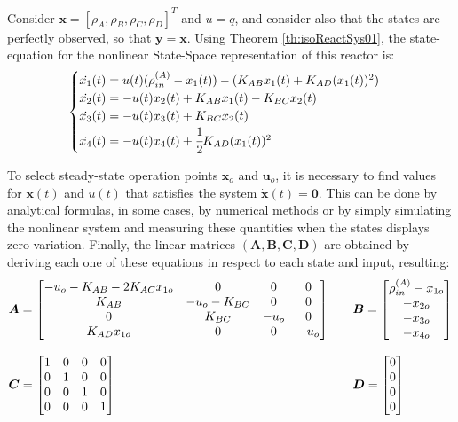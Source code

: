 \documentclass[a4paper,11pt]{book}
\numberwithin{figure}{chapter}
\numberwithin{equation}{chapter}
\numberwithin{table}{chapter}
\theoremstyle{definition}
\begin{document}
Consider $\bm{x} = [\rho_A, \rho_B, \rho_C, \rho_D]^T$ and $u = q$, and consider also that the states are perfectly observed, so that $\bm{y} = \bm{x}$. Using Theorem \ref{th:isoReactSys01},  the state-equation for the nonlinear State-Space representation of this reactor is:
\begin{align}
\begin{cases}
	\dot{x_1}(t) = u(t) (\rho_{in}^{(A)} - x_1(t)) - (K_{AB} x_1(t) + K_{AD} (x_1(t))^2)\\
	\dot{x_2}(t) = -u(t) x_2(t) + K_{AB} x_1(t) - K_{BC} x_2(t) \\
	\dot{x_3}(t) = -u(t) x_3(t) + K_{BC} x_2(t) \\
	\dot{x_4}(t) = -u(t) x_4(t) + \cfrac{1}{2} K_{AD} (x_1(t))^2
\end{cases}
\end{align}

 To select steady-state operation points $\bm{x}_o$ and $\bm{u}_o$, it is necessary to find values for $\bm{x}(t)$ and $u(t)$ that satisfies the system $\dot{\bm{x}}(t) = \bm{0}$. This can be done by analytical formulas, in some cases, by numerical methods or by simply simulating the nonlinear system and measuring these quantities when the states displays zero variation. Finally, the linear matrices $(\bm{A}, \bm{B}, \bm{C}, \bm{D})$ are obtained by deriving each one of these equations in respect to each state and input, resulting:
\begin{align}	\label{eq:isoReact01}
\begin{matrix}
	\bm{A} = \begin{bmatrix}
		-u_o - K_{AB} - 2K_{AC} x_{1o} & 0 & 0 & 0 \\ K_{AB} & -u_o - K_{BC} & 0 & 0 \\ 0 & K_{BC} & -u_o & 0 \\ K_{AD} x_{1o} & 0 & 0 & -u_o
	\end{bmatrix} \hfill & &
	\bm{B} = \begin{bmatrix}
		\rho_{in}^{(A)}-x_{1o} \\ -x_{2o} \\ -x_{3o} \\ -x_{4o} 
	\end{bmatrix} \hfill \\  \\ 
	\bm{C} = \begin{bmatrix}
		1 & 0 & 0 & 0 \\ 0 & 1 & 0 & 0 \\ 0 & 0 & 1 & 0 \\ 0 & 0 & 0 & 1
	\end{bmatrix} \hfill & &
	\bm{D} = \begin{bmatrix}
		0 \\ 0 \\ 0 \\ 0
	\end{bmatrix} \hfill
\end{matrix}
\end{align}
\end{document}
